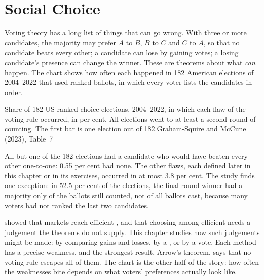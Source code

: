 \chapter{Social Choice}\label{ch:b2:social-choice}

Voting theory has a long list of things that can go wrong. With three or more candidates, the majority
may prefer $A$ to $B$, $B$ to $C$ and $C$ to $A$, so that no candidate beats every other; a candidate can lose
by gaining votes; a losing candidate's presence can change the winner. These are theorems about what
\emph{can} happen. The chart shows how often each happened in 182 American elections of 2004--2022 that used
ranked ballots, in which every voter lists the candidates in order.

\begin{openingchart}{Share of 182 US ranked-choice elections, 2004--2022, in which each flaw of the
  voting rule occurred, in per cent. All elections went to at least a second round of counting. The first
  bar is one election out of 182.}{Graham-Squire and McCune (2023), Table~7}
\end{openingchart}

All but one of the 182 elections had a candidate who would have beaten every other one-to-one: 0.55 per
cent had none. The other flaws, each defined later in this chapter or in its exercises, occurred in at
most 3.8 per cent. The study finds one exception: in 52.5 per cent of the elections, the final-round
winner had a majority only of the ballots still counted, not of all ballots cast, because many voters
had not ranked the last two candidates.

 showed that markets reach efficient , and that choosing among
efficient  needs a judgement the theorems do not supply. This chapter studies how such
judgements might be made: by comparing gains and losses, by a , or by a vote. Each
method has a precise weakness, and the strongest result, Arrow's theorem, says that no voting rule escapes
all of them. The chart is the other half of the story: how often the weaknesses bite depends on what
voters' preferences actually look like.


